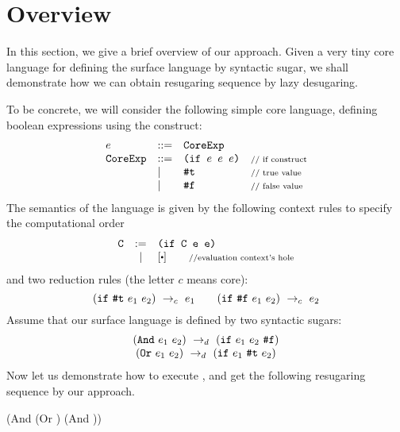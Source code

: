 \section{Overview}
\label{sec2}


In this section, we give a brief overview of our approach. Given a very tiny core language for defining the surface language by syntactic sugar, we shall demonstrate how we can obtain resugaring sequence by lazy desugaring.


To be concrete, we will consider the following simple core language, defining boolean expressions using the  construct:
\[
\begin{array}{lllll}
e &::=& \mbox{\tt CoreExp}\\
\mbox{\tt CoreExp} &::=& \texttt{(if~$e$~$e$~$e$)} &\mbox{{\scriptsize // if construct}}\\
& |& \mbox{\tt \#t}  & \mbox{{\scriptsize // true value}}\\
& |& \mbox{\tt \#f} & \mbox{{\scriptsize // false value}}
\end{array}
\]
The semantics of the language is given by the following context rules to specify the computational order
\[
\begin{array}{lcl}
\m{C} &:=& \Code{(if C e e)}\\
&|&[\bigcdot] \qquad \note{//evaluation context's hole}\\
\end{array}
\]
and two reduction rules (the letter $c$ means core):
\[
\centering
 \redc{(\m{if}~\m{\true}~e_1~e_2)}{e_1}  \qquad \redc{(\m{if}~\m{\false}~e_1~e_2)}{e_2}
\]
Assume that our surface language is defined by two syntactic sugars:
\[
\begin{array}{c}
(\mbox{\tt And}~e_1~e_2) ~\rightarrow_d~ (\mbox{\tt if}~e_1~e_2~\mbox{\tt \#f})\\
(\mbox{\tt Or}~e_1~e_2) ~\rightarrow_d~ (\mbox{\tt if}~e_1~\mbox{\tt \#t}~e_2)
\end{array}
\]
Now let us demonstrate how to execute , and get the following resugaring sequence by our approach.
{\small
\begin{Codes}
    (And (Or \true \false) (And \false \true))
\end{Codes}
}

